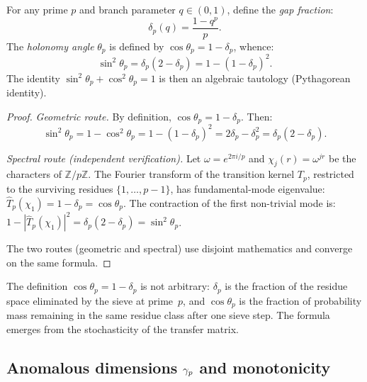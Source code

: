 \documentclass[12pt,a4paper]{article}
\begin{document}
\begin{theorembox}
For any prime $p$ and branch parameter $q \in (0,1)$, define the
\emph{gap fraction}:
\begin{equation}
  \delta_p(q) = \frac{1 - q^p}{p}.
  \tag{A.6}
\end{equation}
The \emph{holonomy angle} $\theta_p$ is defined by
$\cos\theta_p = 1 - \delta_p$, whence:
\begin{equation}
  \sin^2\!\theta_p = \delta_p(2 - \delta_p) = 1 - (1-\delta_p)^2.
  \tag{A.7}
\end{equation}
The identity $\sin^2\!\theta_p + \cos^2\!\theta_p = 1$ is then an
algebraic tautology (Pythagorean identity).

\begin{proof}
\emph{Geometric route.}
By definition, $\cos\theta_p = 1 - \delta_p$. Then:
\[
  \sin^2\!\theta_p = 1 - \cos^2\!\theta_p
  = 1 - (1-\delta_p)^2 = 2\delta_p - \delta_p^2 = \delta_p(2-\delta_p).
\]

\emph{Spectral route (independent verification).}
Let $\omega = e^{2\pi i/p}$ and $\chi_j(r) = \omega^{jr}$ be the
characters of $\mathbb{Z}/p\mathbb{Z}$. The Fourier transform of the
transition kernel $T_p$, restricted to the surviving residues
$\{1, \ldots, p-1\}$, has fundamental-mode eigenvalue:
$\widehat{T}_p(\chi_1) = 1 - \delta_p = \cos\theta_p$. The
contraction of the first non-trivial mode is:
$1 - |\widehat{T}_p(\chi_1)|^2 = \delta_p(2-\delta_p) = \sin^2\!\theta_p$.

The two routes (geometric and spectral) use disjoint mathematics and
converge on the same formula.
\end{proof}
\end{theorembox}

\begin{remark}
The definition $\cos\theta_p = 1 - \delta_p$ is not arbitrary:
$\delta_p$ is the fraction of the residue space eliminated by the sieve
at prime~$p$, and $\cos\theta_p$ is the fraction of probability mass
remaining in the same residue class after one sieve step. The formula
emerges from the stochasticity of the transfer matrix.
\end{remark}

\subsection{Anomalous dimensions $\gamma_{p}$ and monotonicity}
\label{app:gamma}
\end{document}
